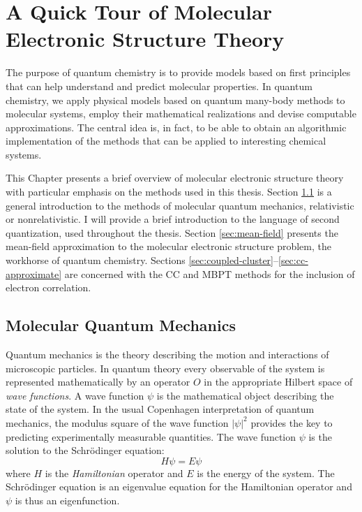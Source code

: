 
\renewcommand{\thefigure}{\arabic{chapter}.\arabic{figure}}

\chapter{A Quick Tour of Molecular Electronic Structure Theory}\label{ch:QM}

The purpose of quantum chemistry is to provide models based on first
principles that can help understand and predict molecular properties.
In quantum chemistry, we apply physical models based on
quantum many-body methods to molecular systems, employ their
mathematical realizations and devise computable approximations.
The central idea is, in fact, to be able to obtain an algorithmic
implementation of the methods that can be applied to interesting
chemical systems.

This Chapter presents a brief overview of molecular electronic structure
theory with particular emphasis on the methods used in this thesis.
Section \ref{sec:mqm} is a general introduction to the methods of
molecular quantum mechanics, relativistic or nonrelativistic.
I will provide a brief introduction to the language of second
quantization, used throughout the thesis.
Section \ref{sec:mean-field} presents the mean-field approximation to
the molecular electronic structure problem, the workhorse of quantum
chemistry.
Sections \ref{sec:coupled-cluster}--\ref{sec:cc-approximate} are
concerned with the \gls{CC} and \gls{MBPT} methods for the inclusion of
electron correlation.

\section{Molecular Quantum Mechanics}\label{sec:mqm}

Quantum mechanics is the theory describing the motion and interactions
of microscopic particles. In quantum theory every observable of the
system is represented mathematically by an operator $O$ in the
appropriate Hilbert space of \emph{wave functions}.
A wave function $\psi$ is the mathematical object describing the state of the
system. In the usual Copenhagen interpretation of quantum mechanics, the
modulus square of the wave function $|\psi|^2$ provides the key to
predicting experimentally measurable quantities.\autocite{Konishi2009-zb}
The wave function $\psi$ is the solution to the Schr\"{o}dinger equation:
\begin{equation}\label{eq:schrodinger}
  H\psi = E\psi
\end{equation}
where $H$ is the \emph{Hamiltonian} operator and $E$ is the energy of
the system. The Schr\"{o}dinger equation is an eigenvalue equation for
the Hamiltonian operator and $\psi$ is thus an
eigenfunction.\autocite{Arfken2013-pt}

